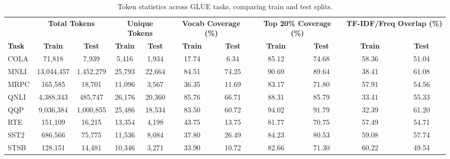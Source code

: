 \begin{table*}[htbp]
\centering
\scriptsize
\setlength{\tabcolsep}{3.5pt}
\begin{tabular}{l|cc|cc|cc|cc|cc}
\toprule
& \multicolumn{2}{c|}{\textbf{Total Tokens}} & \multicolumn{2}{c|}{\textbf{Unique Tokens}} & \multicolumn{2}{c|}{\textbf{Vocab Coverage (\%)}} & \multicolumn{2}{c|}{\textbf{Top 20\% Coverage (\%)}} & \multicolumn{2}{c}{\textbf{TF-IDF/Freq Overlap (\%)}} \\
\textbf{Task} & \textbf{Train} & \textbf{Test} & \textbf{Train} & \textbf{Test} & \textbf{Train} & \textbf{Test} & \textbf{Train} & \textbf{Test} & \textbf{Train} & \textbf{Test} \\
\midrule
COLA & 71,818 & 7,939 & 5,416 & 1,934 & 17.74 & 6.34 & 85.12 & 74.68 & 58.36 & 51.04 \\
MNLI & 13,044,457 & 1,452,279 & 25,793 & 22,664 & 84.51 & 74.25 & 90.69 & 89.64 & 38.41 & 61.08 \\
MRPC & 165,585 & 18,701 & 11,096 & 3,567 & 36.35 & 11.69 & 83.17 & 71.80 & 57.91 & 54.56 \\
QNLI & 4,388,343 & 485,747 & 26,176 & 20,360 & 85.76 & 66.71 & 88.31 & 85.79 & 33.41 & 55.33 \\
QQP & 9,036,384 & 1,000,855 & 25,486 & 18,534 & 83.50 & 60.72 & 94.02 & 91.79 & 32.39 & 61.20 \\
RTE & 151,109 & 16,215 & 13,354 & 4,198 & 43.75 & 13.75 & 81.77 & 70.75 & 57.49 & 54.71 \\
SST2 & 686,566 & 75,775 & 11,536 & 8,084 & 37.80 & 26.49 & 84.23 & 80.53 & 59.08 & 57.74 \\
STSB & 128,151 & 14,481 & 10,346 & 3,271 & 33.90 & 10.72 & 82.66 & 71.30 & 60.22 & 49.54 \\
\bottomrule
\end{tabular}
\caption{Token statistics across GLUE tasks, comparing train and test splits.}
\label{tab:token_statistics}
\end{table*} 